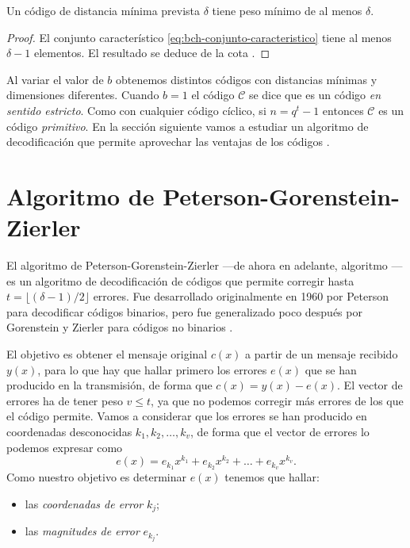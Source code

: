 \begin{theorem}
  Un código  de distancia mínima prevista \(\delta\) tiene peso mínimo de al menos \(\delta\).
\end{theorem}

\begin{proof}
  El conjunto característico \ref{eq:bch-conjunto-caracteristico} tiene al menos \(\delta - 1\) elementos.
  El resultado se deduce de la cota .
\end{proof}

Al variar el valor de \(b\) obtenemos distintos códigos con distancias mínimas y dimensiones diferentes.
Cuando \(b = 1\) el código \(\mathcal C\) se dice que es un código  \textit{en sentido estricto}.
Como con cualquier código cíclico, si \(n = q^t - 1\) entonces \(\mathcal C\) es un código  \textit{primitivo}.
En la sección siguiente vamos a estudiar un algoritmo de decodificación que permite aprovechar las ventajas de los códigos .

\section{Algoritmo de Peterson-Gorenstein-Zierler}

El algoritmo de Peterson-Gorenstein-Zierler —de ahora en adelante, algoritmo — es un algoritmo de decodificación de códigos  que permite corregir hasta \(t = \lfloor (\delta - 1)/2 \rfloor\) errores.
Fue desarrollado originalmente en 1960 por Peterson \parencite{peterson_encoding_1960} para decodificar códigos  binarios, pero fue generalizado poco después por Gorenstein y Zierler para códigos no binarios \parencite{gorenstein_class_1961}.

El objetivo es obtener el mensaje original \(c(x)\) a partir de un mensaje recibido \(y(x)\), para lo que hay que hallar primero los errores \(e(x)\) que se han producido en la transmisión, de forma que \(c(x) = y(x) - e(x)\).
El vector de errores ha de tener peso \(v \leq t\), ya que no podemos corregir más errores de los que el código permite.
Vamos a considerar que los errores se han producido en coordenadas desconocidas \(k_1, k_2, \dots, k_v\), de forma que el vector de errores lo podemos expresar como
\[
  e(x) = e_{k_1}x^{k_1} + e_{k_2}x^{k_2} + \dots + e_{k_v}x^{k_v}.
\]
Como nuestro objetivo es determinar \(e(x)\) tenemos que hallar: \begin{itemize}
  \item las \textit{coordenadas de error} \(k_j\);
  \item las \textit{magnitudes de error} \(e_{k_j}\).
\end{itemize}

